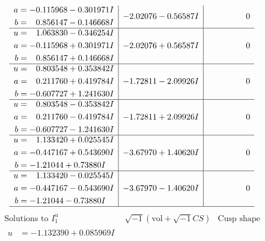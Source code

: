 \documentclass[1p]{elsarticle_modified}
\theoremstyle{definition}
\newcommand{\I}{\sqrt{-1}}
\begin{document}
$$\begin{array}{c|c|c}
\begin{aligned}
a &= -0.115968 - 0.301971 I \\
b &= \phantom{-}0.856147 - 0.146668 I\end{aligned}
 & -2.02076 - 0.56587 I & \phantom{-0.000000 } 0 \\ \hline\begin{aligned}
u &= \phantom{-}1.063830 - 0.346254 I \\
a &= -0.115968 + 0.301971 I \\
b &= \phantom{-}0.856147 + 0.146668 I\end{aligned}
 & -2.02076 + 0.56587 I & \phantom{-0.000000 } 0 \\ \hline\begin{aligned}
u &= \phantom{-}0.803548 + 0.353842 I \\
a &= \phantom{-}0.211760 + 0.419784 I \\
b &= -0.607727 + 1.241630 I\end{aligned}
 & -1.72811 - 2.09926 I & \phantom{-0.000000 } 0 \\ \hline\begin{aligned}
u &= \phantom{-}0.803548 - 0.353842 I \\
a &= \phantom{-}0.211760 - 0.419784 I \\
b &= -0.607727 - 1.241630 I\end{aligned}
 & -1.72811 + 2.09926 I & \phantom{-0.000000 } 0 \\ \hline\begin{aligned}
u &= \phantom{-}1.133420 + 0.025545 I \\
a &= -0.447167 + 0.543690 I \\
b &= -1.21044 + 0.73880 I\end{aligned}
 & -3.67970 + 1.40620 I & \phantom{-0.000000 } 0 \\ \hline\begin{aligned}
u &= \phantom{-}1.133420 - 0.025545 I \\
a &= -0.447167 - 0.543690 I \\
b &= -1.21044 - 0.73880 I\end{aligned}
 & -3.67970 - 1.40620 I & \phantom{-0.000000 } 0\\
 \hline 
 \end{array}$$\newpage$$\begin{array}{c|c|c}  
\text{Solutions to }I^u_{1}& \I (\text{vol} + \sqrt{-1}CS) & \text{Cusp shape}\\
 \hline 
\begin{aligned}
u &= -1.132390 + 0.085969 I \\

\end{aligned}
\end{array}$$
\end{document}
